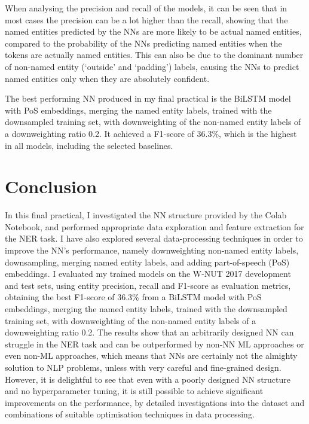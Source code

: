 \documentclass[11pt,a4paper]{article}
\begin{document}
When analysing the precision and recall of the models, it can be seen that in most cases the precision can be a lot higher than the recall, showing that the named entities predicted by the NNs are more likely to be actual named entities, compared to the probability of the NNs predicting named entities when the tokens are actually named entities. This can also be due to the dominant number of non-named entity (`outside' and `padding') labels, causing the NNs to predict named entities only when they are absolutely confident.

The best performing NN produced in my final practical is the BiLSTM model with PoS embeddings, merging the named entity labels, trained with the downsampled training set, with downweighting of the non-named entity labels of a downweighting ratio 0.2. It achieved a F1-score of 36.3\%, which is the highest in all models, including the selected baselines.

\section{Conclusion}

In this final practical, I investigated the NN structure provided by the Colab Notebook, and performed appropriate data exploration and feature extraction for the NER task. I have also explored several data-processing techniques in order to improve the NN's performance, namely downweighting non-named entity labels, downsampling, merging named entity labels, and adding part-of-speech (PoS) embeddings. I evaluated my trained models on the W-NUT 2017 development and test sets, using entity precision, recall and F1-score as evaluation metrics, obtaining the best F1-score of 36.3\% from a BiLSTM model with PoS embeddings, merging the named entity labels, trained with the downsampled training set, with downweighting of the non-named entity labels of a downweighting ratio 0.2. The results show that an arbitrarily designed NN can struggle in the NER task and can be outperformed by non-NN ML approaches or even non-ML approaches, which means that NNs are certainly not the almighty solution to NLP problems, unless with very careful and fine-grained design. However, it is delightful to see that even with a poorly designed NN structure and no hyperparameter tuning, it is still possible to achieve significant improvements on the performance, by detailed investigations into the dataset and combinations of suitable optimisation techniques in data processing.



\end{document}
